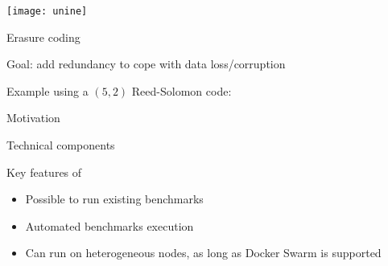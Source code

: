 



\begin{frame}[plain]
  
\titlepage

\begin{center}
\texttt{[image: unine]}
\end{center}

\end{frame}


\subtitle[Introduction]{Introduction}

\begin{frame}{Erasure coding}
    \begin{snugshade}
        Goal: add redundancy to cope with data loss/corruption
    \end{snugshade}

    Example using a $\left(5,2\right)$ Reed-Solomon code:
    \begin{figure}
    
    \end{figure}
\end{frame}

\begin{frame}{Motivation}
\end{frame}

\subtitle[Architecture]{Architecture}

\begin{frame}{Technical components}
    \centering
    
\end{frame}

\begin{frame}{Key features of \sys}
    \begin{itemize}
        \item Possible to run existing benchmarks
        \item Automated benchmarks execution
        \item Can run on heterogeneous nodes, as long as Docker Swarm is supported
    \end{itemize}
\end{frame}

